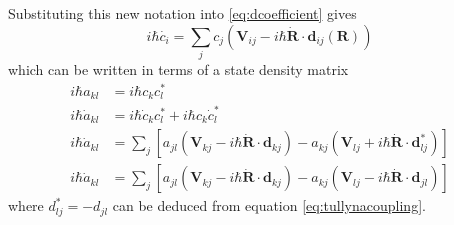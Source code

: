           Substituting this new notation into \ref{eq:dcoefficient} gives
          \begin{equation}
            i\hbar \dot{c_i} = \sum_j c_j \left(\mathbf{V}_{ij} - i\hbar \dot{\mathbf{R}}\cdot\mathbf{d}_{ij}(\mathbf{R}) \right)
          \end{equation}
          which can be written in terms of a state density matrix
          \begin{align}
            i\hbar a_{kl} &= i\hbar c_k c_l^*\\
            i\hbar \dot{a}_{kl} &= i\hbar \dot{c}_k c_l^* + i\hbar c_k \dot{c}_l^* \\
            i\hbar \dot{a}_{kl} &= \sum_j \left[ a_{jl} (\mathbf{V}_{kj} - i\hbar \dot{\mathbf{R}} \cdot \mathbf{d}_{kj})
              - a_{kj} ( \mathbf{V}_{lj} + i\hbar \dot{\mathbf{R}} \cdot \mathbf{d}_{lj}^*) \right] \\
            i\hbar \dot{a}_{kl} &= \sum_j \left[ a_{jl} (\mathbf{V}_{kj} - i\hbar \dot{\mathbf{R}} \cdot \mathbf{d}_{kj})
              - a_{kj} ( \mathbf{V}_{lj} - i\hbar \dot{\mathbf{R}} \cdot \mathbf{d}_{jl}) \right]
          \end{align}
          where \(d_{lj}^* = -d_{jl}\) can be deduced from equation \ref{eq:tullynacoupling}.

